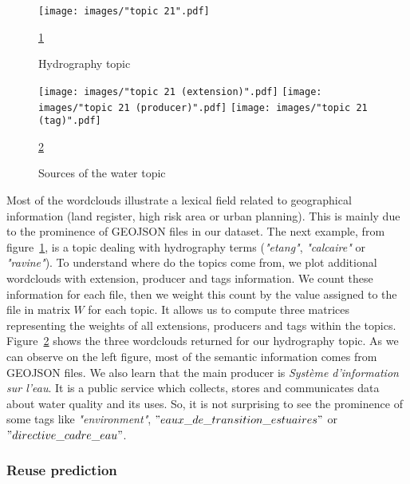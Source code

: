 \documentclass[a4paper]{article}
\begin{document}
	\begin{figure}[]
		\texttt{[image: images/"topic 21".pdf]}
		\caption{Hydrography topic}
		\label{fig:wc water}
		\ref{fig:wc water}
	\end{figure}

	\begin{figure}[]
		\texttt{[image: images/"topic 21 (extension)".pdf]}
		\label{fig:wc-extension}
		\endminipage\hfill
		\texttt{[image: images/"topic 21 (producer)".pdf]}
		\label{fig:wc-producer}
		\endminipage\hfill
		\texttt{[image: images/"topic 21 (tag)".pdf]}
		\label{fig:wc-tag}
		\endminipage
		\caption{Sources of the water topic}
		\label{fig:wc water 2}
		\ref{fig:wc water 2}
	\end{figure}

	Most of the wordclouds illustrate a lexical field related to geographical information (land register, high risk area or urban planning). This is mainly due to the prominence of GEOJSON files in our dataset. The next example, from figure~\ref{fig:wc water}, is a topic dealing with hydrography terms (\textit{"etang"}, \textit{"calcaire"} or \textit{"ravine"}). To understand where do the topics come from, we plot additional wordclouds with extension, producer and tags information. We count these information for each file, then we weight this count by the value assigned to the file in matrix $W$ for each topic. It allows us to compute three matrices representing the weights of all extensions, producers and tags within the topics. Figure~\ref{fig:wc water 2} shows the three wordclouds returned for our hydrography topic. As we can observe on the left figure, most of the semantic information comes from GEOJSON files. We also learn that the main producer is \textit{Système d'information sur l'eau}. It is a public service which collects, stores and communicates data about water quality and its uses. So, it is not surprising to see the prominence of some tags like \textit{"environment"}, \textit{$"eaux\_de\_transition\_estuaires"$} or \textit{$"directive\_cadre\_eau"$}.
	
	\subsubsection{Reuse prediction}
	
\end{document}
